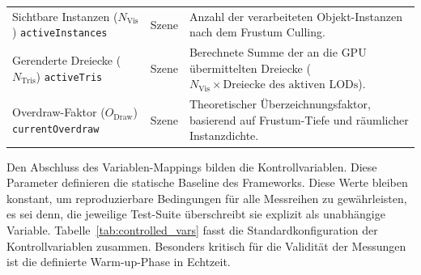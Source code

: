 \begin{table}[htbp]
\begin{tabularx}{\textwidth}{@{} >{\raggedright\arraybackslash}p{4.8cm} l >{\raggedright\arraybackslash}X @{}}
        Sichtbare Instanzen ($N_{\text{Vis}}$) \newline \scriptsize{\texttt{activeInstances}}
        & Szene
        & Anzahl der verarbeiteten Objekt-Instanzen nach dem Frustum Culling. \\

        Gerenderte Dreiecke ($N_{\text{Tris}}$) \newline \scriptsize{\texttt{activeTris}}
        & Szene
        & Berechnete Summe der an die \ac{GPU} übermittelten Dreiecke ($N_{\text{Vis}} \times \text{Dreiecke des aktiven
        LODs}$). \\

        Overdraw-Faktor ($O_{\text{Draw}}$) \newline \scriptsize{\texttt{currentOverdraw}}
        & Szene
        & Theoretischer Überzeichnungsfaktor, basierend auf Frustum-Tiefe und räumlicher Instanzdichte. \\

        \bottomrule
    \end{tabularx}
\end{table}

Den Abschluss des Variablen-Mappings bilden die Kontrollvariablen.
Diese Parameter definieren die statische Baseline des Frameworks.
Diese Werte bleiben konstant, um reproduzierbare Bedingungen für alle Messreihen zu gewährleisten, es sei denn, die
jeweilige Test-Suite überschreibt sie explizit als unabhängige Variable.
Tabelle~\ref{tab:controlled_vars} fasst die Standardkonfiguration der Kontrollvariablen zusammen.
Besonders kritisch für die Validität der Messungen ist die definierte Warm-up-Phase in Echtzeit.

